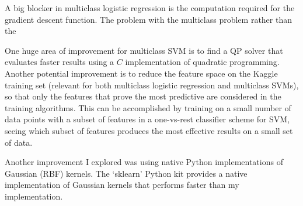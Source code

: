 \documentclass[10pt]{article}
\begin{document}
A big blocker in multiclass logistic regression is the computation required for the gradient descent function. The problem with the multiclass problem rather than the 

One huge area of improvement for multiclass SVM is to find a QP solver that evaluates faster results using a $C$ implementation of quadratic programming. Another potential improvement is to reduce the feature space on the Kaggle training set (relevant for both multiclass logistic regression and multiclass SVMs), so that only the features that prove the most predictive are considered in the training algorithms. This can be accomplished by training on a small number of data points with a subset of features in a one-vs-rest classifier scheme for SVM, seeing which subset of features produces the most effective results on a small set of data.

Another improvement I explored was using native Python implementations of Gaussian (RBF) kernels. The `sklearn' Python kit provides a native implementation of Gaussian kernels that performs faster than my implementation.
\end{document}
